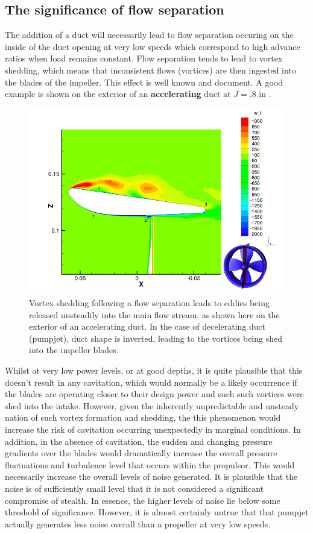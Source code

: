 \documentclass{article}\usepackage[]{graphicx}\usepackage[]{color}
\begin{document}
\subsection{The significance of flow separation}
The addition of a duct will necessarily lead to flow separation occuring on the inside of the duct opening at very low speeds which correspond to high advance ratios when load remains constant.  Flow separation tends to lead to vortex shedding, which means that inconsistent flows (vortices) are then ingested into the blades of the impeller.  This effect is well known and document.  A good example is shown on the exterior of an \textbf{accelerating} duct at $J = .8$ in \cite{willemsen2013}.

\begin{figure}
\includegraphics[width=\textwidth]{VortexShedding.png}
\caption{Vortex shedding following a flow separation leads to eddies being released unsteadily into the main flow stream, as shown here on the exterior of an accelerating duct.  In the case of decelerating duct (pumpjet), duct shape is inverted, leading to the vortices being shed into the impeller blades. \parencite{willemsen2013}}
\label{fig:VortexShedding.png}
\end{figure}

Whilst at very low power levels, or at good depths, it is quite plausible that this doesn't result in any cavitation, which would normally be a likely occurrence if the blades are operating closer to their design power and such such vortices were shed into the intake.  However, given the inherently unpredictable and unsteady nation of such vortex formation and shedding, the this phenomenon would increase the risk of cavitation occurring unexpectedly in marginal conditions.  In addition, in the absence of cavitation, the sudden and changing pressure gradients over the blades would dramatically increase the overall pressure fluctuations and turbulence level that occurs within the propulsor.  This would necessarily increase the overall levels of noise generated.  It is plausible that the noise is of sufficiently small level that it is not considered a significant compromise of stealth.  In essence, the higher levels of noise lie below some threshold of significance.  However, it is almost certainly untrue that that pumpjet actually generates less noise overall than a propeller at very low speeds.
\end{document}
